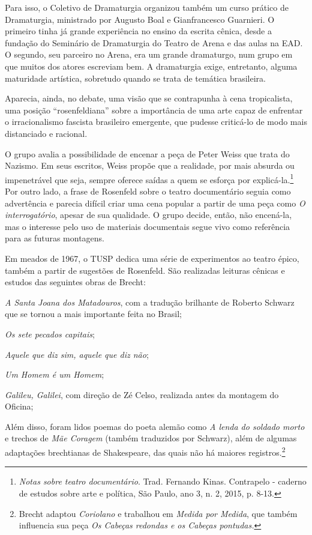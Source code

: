 Para isso, o Coletivo de Dramaturgia organizou também um curso prático
de Dramaturgia, ministrado por Augusto Boal e Gianfrancesco Guarnieri. O
primeiro tinha já grande experiência no ensino da escrita cênica, desde
a fundação do Seminário de Dramaturgia do Teatro de Arena e das aulas na
EAD. O segundo, seu parceiro no Arena, era um grande dramaturgo, num
grupo em que muitos dos atores escreviam bem. A dramaturgia exige,
entretanto, alguma maturidade artística, sobretudo quando se trata de
temática brasileira.

Aparecia, ainda, no debate, uma visão que se contrapunha à cena
tropicalista, uma posição “rosenfeldiana” sobre a importância de uma
arte capaz de enfrentar o irracionalismo fascista brasileiro emergente,
que pudesse criticá-lo de modo mais distanciado e racional.

O grupo avalia a possibilidade de encenar a peça de Peter Weiss que
trata do Nazismo. Em seus escritos, Weiss propõe que a realidade, por
mais absurda ou impenetrável que seja, sempre oferece saídas a quem se
esforça por explicá-la.\footnote{\textit{Notas sobre teatro documentário}.
  Trad. Fernando Kinas. Contrapelo - caderno de estudos sobre arte e
  política, São Paulo, ano 3, n. 2, 2015, p. 8-13.} Por outro lado, a
frase de Rosenfeld sobre o teatro documentário seguia como advertência e
parecia difícil criar uma cena popular a partir de uma peça como \textit{O
interrogatório}, apesar de sua qualidade. O grupo decide, então, não
encená-la, mas o interesse pelo uso de materiais documentais segue vivo
como referência para as futuras montagens.

Em meados de 1967, o TUSP dedica uma série de experimentos ao teatro
épico, também a partir de sugestões de Rosenfeld. São realizadas
leituras cênicas e estudos das seguintes obras de Brecht:

\textit{A Santa Joana dos Matadouros}, com a tradução brilhante de Roberto
Schwarz que se tornou a mais importante feita no Brasil;

\textit{Os sete pecados capitais};

\textit{Aquele que diz sim, aquele que diz não};

\textit{Um Homem é um Homem};

\textit{Galileu, Galilei}, com direção de Zé Celso, realizada antes da
montagem do Oficina;

Além disso, foram lidos poemas do poeta alemão como \textit{A lenda do
soldado morto} e trechos de \textit{Mãe Coragem} (também traduzidos por
Schwarz), além de algumas adaptações brechtianas de Shakespeare, das
quais não há maiores registros.\footnote{Brecht adaptou \textit{Coriolano}
  e trabalhou em \textit{Medida por Medida}, que também influencia sua peça
  \textit{Os Cabeças redondas e os Cabeças pontudas.}}


